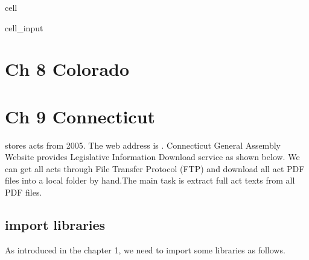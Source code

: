 \documentclass[letterpaper,10pt,english]{jupyterBook}
\begin{document}
\begin{sphinxuseclass}{cell}
\begin{sphinxVerbatimInput}
\begin{sphinxuseclass}{cell_input}
\begin{sphinxVerbatim}[commandchars=\\\{\}]
\end{sphinxVerbatim}

\end{sphinxuseclass}\end{sphinxVerbatimInput}

\end{sphinxuseclass}
\sphinxstepscope


\chapter{Ch 8 Colorado}
\label{\detokenize{ch8:ch-8-colorado}}\label{\detokenize{ch8::doc}}
\sphinxstepscope


\chapter{Ch 9 Connecticut}
\label{\detokenize{ch9:ch-9-connecticut}}\label{\detokenize{ch9::doc}}
\sphinxAtStartPar
{} stores acts from 2005. The web address is . Connecticut General Assembly Website provides Legislative Information Download service as shown below. We can get all acts through File Transfer Protocol (FTP) and download all act PDF files into a local folder by hand.The main task is extract full act texts from all PDF files.


\section{import libraries}
\label{\detokenize{ch9:import-libraries}}
\sphinxAtStartPar
As introduced in the chapter 1, we need to import some libraries as follows.
\end{document}
